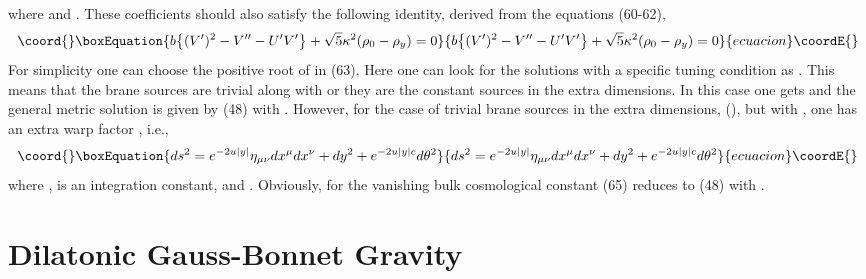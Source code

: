 \documentclass[a4paper,12pt]{article}
\begin{document}
where \coordHE{} and 
\coordHE{}. These coefficients should also satisfy the following 
identity, derived from the equations (60-62), 
\begin{equation}\coord{}\boxEquation{
b\big\{(V')^2-V''-U'V'\big\}+\sqrt{5}\kappa^2(\rho_0-\rho_y)=0
}{
b\big\{(V')^2-V''-U'V'\big\}+\sqrt{5}\kappa^2(\rho_0-\rho_y)=0
}{ecuacion}\coordE{}\end{equation}
For simplicity one can choose the positive root of \coordHE{} in (63). 
Here one can look for the solutions with a specific tuning condition as 
\coordHE{}. This means that the brane sources are 
trivial along with \coordHE{} or they are the constant sources 
in the extra dimensions. In this case one gets \coordHE{} and the general metric 
solution is given by (48) with \coordHE{}. 
However, for the case of trivial brane sources in the extra dimensions, 
(\coordHE{}), but with \coordHE{}, one has an extra warp factor 
\coordHE{}, i.e.,
\begin{equation}\coord{}\boxEquation{
ds^2= e^{-2u|y|}\eta_{\mu\nu}dx^\mu dx^\nu + dy^2 
+ e^{-2u|y|c} d\theta^2
}{
ds^2= e^{-2u|y|}\eta_{\mu\nu}dx^\mu dx^\nu + dy^2 
+ e^{-2u|y|c} d\theta^2
}{ecuacion}\coordE{}\end{equation}
where \coordHE{}, \myHighlight{$\beta$}\coordHE{} is an 
integration constant, and 
\coordHE{}. Obviously, for the vanishing bulk 
cosmological constant (65) reduces to (48) with 
\coordHE{}.
\nopagebreak[12]
\section{Dilatonic Gauss-Bonnet Gravity}
\end{document}
